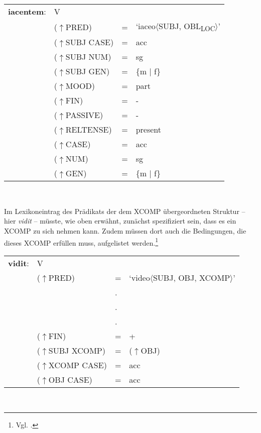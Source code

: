 \documentclass[12pt,a4paper]{article}
\begin{document}
\begin{singlespace}
\begin{tabular}{ l  l  l  l  } 
\textbf{iacentem}: & \: V \\ 
$\qquad$ & \: ($\uparrow$PRED) & = & `iaceo$\langle$SUBJ, OBL\textsubscript{LOC}$\rangle$'\\
$\qquad$ & \: ($\uparrow$SUBJ CASE) & = & acc \\
$\qquad$ & \: ($\uparrow$SUBJ NUM) & = & sg \\
$\qquad$ & \: ($\uparrow$SUBJ GEN) & = & \{m $\mid$ f\} \\
$\qquad$ & \: ($\uparrow$MOOD) & = & part\\
$\qquad$ & \:  ($\uparrow$FIN) & = & - \\
$\qquad$ & \: ($\uparrow$PASSIVE) & = & - \\
$\qquad$ & \: ($\uparrow$RELTENSE) & = & present \\
$\qquad$ & \: ($\uparrow$CASE) & = & acc \\
$\qquad$ & \: ($\uparrow$NUM) & = & sg \\
$\qquad$ & \: ($\uparrow$GEN) & = & \{m $\mid$ f\} \\

\end{tabular}\\
\newline
\end{singlespace}
Im Lexikoneintrag des Prädikats der dem XCOMP übergeordneten Struktur -- hier \textit{vidit} -- müsste, wie oben erwähnt, zunächst spezifiziert sein, dass es ein XCOMP zu sich nehmen kann. Zudem müssen dort auch die Bedingungen, die dieses XCOMP erfüllen muss, aufgelistet werden.\footnote{Vgl. \cite[56]{Skript}.} \\
\begin{singlespace}
\begin{tabular}{ l  l  l  l  } 
\textbf{vidit}: & \: V \\
$\qquad$ & \: ($\uparrow$PRED) & = & `video$\langle$SUBJ, OBJ, XCOMP$\rangle$'\\
$\qquad$ & $\qquad$ & . \\
$\qquad$ & $\qquad$ & . \\
$\qquad$ & $\qquad$ & . \\
$\qquad$ & \:  ($\uparrow$FIN) & = & + \\
$\qquad$ & \:  ($\uparrow$SUBJ XCOMP) & = & ($\uparrow$OBJ)\\
$\qquad$ & \: ($\uparrow$XCOMP CASE) & = & acc \\
$\qquad$ & \: ($\uparrow$OBJ CASE) & = & acc \\
\end{tabular}\\
\newline
\end{singlespace}
\end{document}
